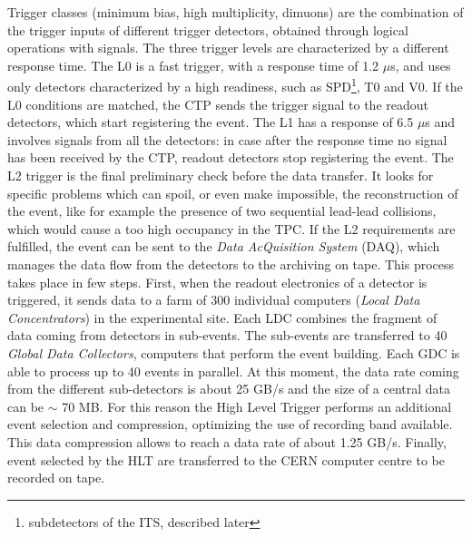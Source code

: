 Trigger classes (minimum bias, high multiplicity, dimuons) are the combination of the trigger inputs of different trigger detectors, obtained through logical operations with signals. The three trigger levels are characterized by a different response time. The L0 is a fast trigger, with a response time of 1.2 $\mu$s, and uses only detectors characterized by a high readiness, such as SPD\footnote{subdetectors of the ITS, described later}, T0 and V0. If the L0 conditions are matched, the CTP sends the trigger signal to the readout detectors, which start registering the event. The L1 has a response of 6.5 $\mu$s and involves signals from all the detectors: in case after the response time no signal has been received by the CTP, readout detectors stop registering the event. The L2 trigger is the final preliminary check before the data transfer. It looks for specific problems which can spoil, or even make impossible, the reconstruction of the event, like for example the presence of two sequential lead-lead collisions, which would cause a too high occupancy in the TPC. If the L2 requirements are fulfilled, the event can be sent to the \textit{Data AcQuisition System} (DAQ), which manages the data flow from the detectors to the archiving on tape. This process takes place in few steps. First, when the readout electronics of a detector is triggered, it sends data to a farm of 300 individual computers (\textit{Local Data Concentrators}) in the experimental site. Each LDC combines the fragment of data coming from detectors in sub-events. The sub-events are transferred to 40 \textit{Global Data Collectors}, computers that perform the event building. Each GDC is able to process up to 40 events in parallel. At this moment, the data rate coming from the different sub-detectors is about 25 GB/s and the size of a central data can be $\sim$ 70 MB. For this reason the High Level Trigger performs an additional event selection and compression, optimizing the use of recording band available. This data compression allows to reach a data rate of about 1.25 GB/s. Finally, event selected by the HLT are transferred to the CERN computer centre to be recorded on tape.
